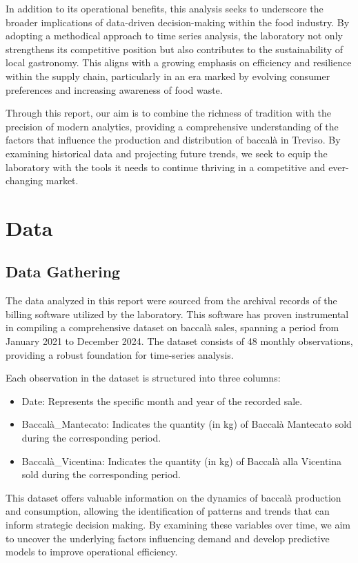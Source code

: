 \documentclass[10pt,twocolumn,letterpaper]{article}
\begin{document}
In addition to its operational benefits, this analysis seeks to underscore the broader implications of data-driven decision-making within the food industry. By adopting a methodical approach to time series analysis, the laboratory not only strengthens its competitive position but also contributes to the sustainability of local gastronomy. This aligns with a growing emphasis on efficiency and resilience within the supply chain, particularly in an era marked by evolving consumer preferences and increasing awareness of food waste.

Through this report, our aim is to combine the richness of tradition with the precision of modern analytics, providing a comprehensive understanding of the factors that influence the production and distribution of baccalà in Treviso. By examining historical data and projecting future trends, we seek to equip the laboratory with the tools it needs to continue thriving in a competitive and ever-changing market.

\section{Data}
\subsection{Data Gathering}
The data analyzed in this report were sourced from the archival records of the billing software utilized by the laboratory. This software has proven instrumental in compiling a comprehensive dataset on baccalà sales, spanning a period from January 2021 to December 2024. The dataset consists of 48 monthly observations, providing a robust foundation for time-series analysis.

Each observation in the dataset is structured into three columns:
\begin{itemize}
    \item Date: Represents the specific month and year of the recorded sale.
    \item Baccalà\_Mantecato: Indicates the quantity (in kg) of Baccalà Mantecato sold during the corresponding period.
    \item Baccalà\_Vicentina: Indicates the quantity (in kg) of Baccalà alla Vicentina sold during the corresponding period.
\end{itemize}


This dataset offers valuable information on the dynamics of baccalà production and consumption, allowing the identification of patterns and trends that can inform strategic decision making. By examining these variables over time, we aim to uncover the underlying factors influencing demand and develop predictive models to improve operational efficiency.
\end{document}
